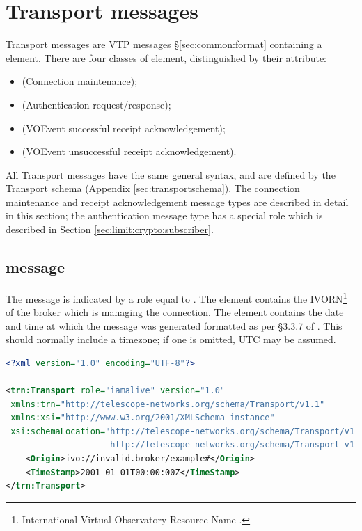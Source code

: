 \documentclass[a4paper,11pt]{ivoa}
\begin{document}
\section{Transport messages}
\label{sec:transport}

Transport messages are VTP messages \S\ref{sec:common:format} containing a
 element. There are four classes of
 element, distinguished by their 
attribute:

\begin{itemize}
\item{ (Connection maintenance);}
\item{ (Authentication request/response);}
\item{ (VOEvent successful receipt acknowledgement);}
\item{ (VOEvent unsuccessful receipt acknowledgement).}
\end{itemize}

All Transport messages have the same general syntax, and are defined by the
Transport schema (Appendix \ref{sec:transportschema}). The connection
maintenance and receipt acknowledgement message types are described in detail
in this section; the authentication message type has a special role which is
described in Section \ref{sec:limit:crypto:subscriber}.

\subsection{ message}
\label{sec:transport:iamalive}

The  message is indicated by a role equal to
. The  element contains the
IVORN\footnote{International Virtual Observatory Resource Name
\citep{Plante:2007}.} of the broker which is managing the connection. The
 element contains the date and time at which the message
was generated formatted as per \S3.3.7 of \citet{Peterson:2012}. This should
normally include a timezone; if one is omitted, UTC may be assumed.

\begin{lstlisting}[language=xml,caption=Sample \xmlel{iamalive} message.,
                   label=lst:iamalive]
<?xml version="1.0" encoding="UTF-8"?>

<trn:Transport role="iamalive" version="1.0"
 xmlns:trn="http://telescope-networks.org/schema/Transport/v1.1"
 xmlns:xsi="http://www.w3.org/2001/XMLSchema-instance"
 xsi:schemaLocation="http://telescope-networks.org/schema/Transport/v1.1
                     http://telescope-networks.org/schema/Transport-v1.1.xsd">
    <Origin>ivo://invalid.broker/example#</Origin>
    <TimeStamp>2001-01-01T00:00:00Z</TimeStamp>
</trn:Transport>
\end{lstlisting}
\end{document}
